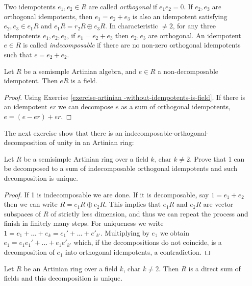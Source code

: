 \noindent
Two idempotents $e_1,e_2 \in R$ are
called {\it orthogonal}
if $e_1e_2=0$. If $e_2,e_3$ are
orthogonal idempotents,
then $e_1=e_2+e_3$ is also an
idempotent
satisfying $e_2,e_3 \in e_1R$ and
$e_1R=r_2R \oplus e_3R$.
In characteristic $\neq 2$, for any
three idempotents
$e_1,e_2,e_3$, if $e_1=e_2+e_3$
then $e_2,e_3$ are orthogonal.
An idempotent $e \in R$ is called
{\it indecomposable} if there are
no non-zero
orthogonal idempotents such that
$e = e_2+e_2$.

\begin{exercise}
\label{exercise-subal-gener-indec-field}
Let $R$ be a semismple Artinian algebra,
and $e \in R$ a non-decomposable idempotent.
Then $eR$ is a field.
\end{exercise}

\begin{proof}
Using Exercise \ref{exercise-artinian
-without-idempotents-is-field}.
If there is an idempotent $er$
we can decompose $e$ as a sum
of orthogonal idempotents,
$e = (e-er)+er$.
\end{proof}

\noindent
The next exercise show that
there is an
indecomposable-orthogonal-
decomposition
of unity in an Artinian ring:

\begin{exercise}
\label{exercise-decom-unity-ortho-idemp}
Let $R$ be a semisimple Artinian ring
over a field $k$, $\text{char }k\neq 2$.
Prove that 1 can be decomposed to a
sum of indecomposable orthogonal
idempotents and such decomposition
is unique.
\end{exercise}

\begin{proof}
If 1 is indecomposable we are done.
If it is decomposable, say
$1=e_1+e_2$ then
we can write
$R=e_1R\oplus e_2R$.
This implies that $e_1R$ and $e_2R$
are vector subspaces of $R$
of strictly less dimension,
and thus we can repeat the process
and finish in finitely many steps.
For uniqueness we write
$1=e_1+…+e_k=e_1'+…+e'_{k'}$.
Multiplying by $e_1$ we obtain
$e_1=e_1e_1'+…+e_1e'_{k'}$
which, if the decompositions
do not coincide, is a decomposition
of $e_1$ into orthogonal idempotents,
a contradiction.
\end{proof}

\begin{exercise}
\label{exercise-artin-ring-direc-sum-field}
Let $R$ be an Artinian ring over a
field $k$, $\text{char }k\neq 2$.
Then $R$ is a direct sum of fields
and this decomposition is unique.
\end{exercise}

